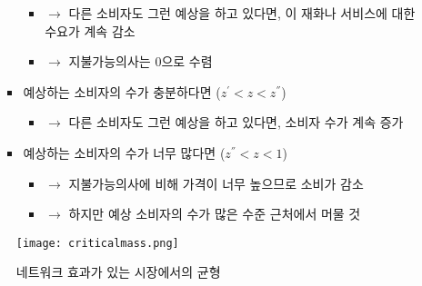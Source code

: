 \begin{itemize}
\begin{itemize}
\begin{itemize}
			\begin{itemize}
			\item $\rightarrow$ 다른 소비자도 그런 예상을 하고 있다면, 이 재화나 서비스에 대한 수요가 계속 감소 
			\item $\rightarrow$ 지불가능의사는 0으로 수렴
			\end{itemize}
		\item 예상하는 소비자의 수가 충분하다면 ($ z^{'} < z <  z^{''}$)
			\begin{itemize}
			\item $\rightarrow$ 다른 소비자도 그런 예상을 하고 있다면, 소비자 수가 계속 증가
			\end{itemize}
		\item 예상하는 소비자의 수가 너무 많다면 ($z^{''} < z < 1$)
			\begin{itemize}
			\item $\rightarrow$ 지불가능의사에 비해 가격이 너무 높으므로 소비가 감소 
			\item $\rightarrow$ 하지만 예상 소비자의 수가 많은 수준 근처에서 머물 것
			\end{itemize}
		\end{itemize}
	\end{itemize}
	
	\begin{figure}[htbp]
	\begin{center}
	\texttt{[image: criticalmass.png]}
	\caption{네트워크 효과가 있는 시장에서의 균형}
	\label{fig:criticalmass}
	\end{center}
	\end{figure}

	
	

\end{itemize}
